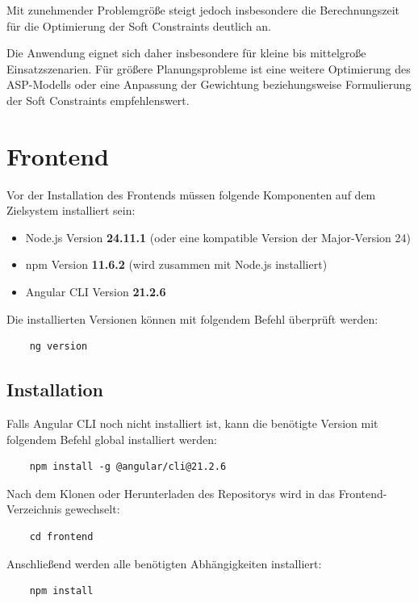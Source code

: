 Mit zunehmender Problemgröße steigt jedoch insbesondere die Berechnungszeit für die Optimierung der Soft Constraints deutlich an.

Die Anwendung eignet sich daher insbesondere für kleine bis mittelgroße Einsatzszenarien. Für größere Planungsprobleme ist eine weitere Optimierung des ASP-Modells oder eine Anpassung der Gewichtung beziehungsweise Formulierung der Soft Constraints empfehlenswert.

\section{Frontend}
Vor der Installation des Frontends müssen folgende Komponenten auf dem Zielsystem installiert sein:

\begin{itemize}
	\item Node.js Version \textbf{24.11.1} (oder eine kompatible Version der Major-Version 24)
	\item npm Version \textbf{11.6.2} (wird zusammen mit Node.js installiert)
	\item Angular CLI Version \textbf{21.2.6}
\end{itemize}

Die installierten Versionen können mit folgendem Befehl überprüft werden:

\begin{verbatim}
	ng version
\end{verbatim}

\subsection{Installation}
Falls Angular CLI noch nicht installiert ist, kann die benötigte Version mit folgendem Befehl global installiert werden:

\begin{verbatim}
	npm install -g @angular/cli@21.2.6
\end{verbatim}
Nach dem Klonen oder Herunterladen des Repositorys wird in das Frontend-Verzeichnis gewechselt:

\begin{verbatim}
	cd frontend
\end{verbatim}

Anschließend werden alle benötigten Abhängigkeiten installiert:

\begin{verbatim}
	npm install
\end{verbatim}

